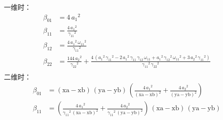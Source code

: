 \documentclass{book}
\begin{document}
\begin{example}
\begin{example}{}{}
\begin{example}
\begin{example}
\begin{example}
一维时：
\begin{equation}
    \begin{aligned}
        \beta_{01} & = 4\,{a_1 }^2                                                                                                                                                                                                                                                                 \\
        \beta_{11} & = \frac{4\,{a_1 }^2 }{{\gamma_{11} }^2 }                                                                                                                                                                                                                                      \\
        \beta_{12} & = \frac{4\,{a_1 }^2 \,{\omega_{11} }^2 }{{\gamma_{11} }^2 }                                                                                                                                                                                                                   \\
        \beta_{22} & = \frac{144\,{a_2 }^2 }{{\gamma_{22} }^2 }+\frac{4\,{\left({a_1 }^2 \,{\gamma_{11} }^2 -2\,{a_1 }^2 \,\gamma_{11} \,\gamma_{12} \,\omega_{11} +{a_1 }^2 \,{\gamma_{12} }^2 \,{\omega_{11} }^2 +3\,{a_2 }^2 \,{\gamma_{11} }^2 \right)}}{{\gamma_{11} }^2 \,{\gamma_{22} }^2 } \\
    \end{aligned}
\end{equation}
二维时：
\begin{equation}
    \begin{aligned}
        \beta_{01} & = {\left(\mathrm{xa}-\mathrm{xb}\right)}\,{\left(\mathrm{ya}-\mathrm{yb}\right)}\,{\left(\frac{4\,{a_1 }^2 }{{{\left(\mathrm{xa}-\mathrm{xb}\right)}}^2 }+\frac{4\,{a_2 }^2 }{{{\left(\mathrm{ya}-\mathrm{yb}\right)}}^2 }\right)}                                                                                                                                                                                \\
        \beta_{11} & = {\left(\frac{4\,{a_1 }^2 }{{\gamma_{11} }^2 \,{{\left(\mathrm{xa}-\mathrm{xb}\right)}}^2 }+\frac{4\,{a_2 }^2 }{{\gamma_{11} }^2 \,{{\left(\mathrm{ya}-\mathrm{yb}\right)}}^2 }\right)}\,{\left(\mathrm{xa}-\mathrm{xb}\right)}\,{\left(\mathrm{ya}-\mathrm{yb}\right)}                                                                                                                                          \\

\end{aligned}
\end{equation}
\end{example}
\end{example}
\end{example}
\end{example}
\end{example}
\end{document}
